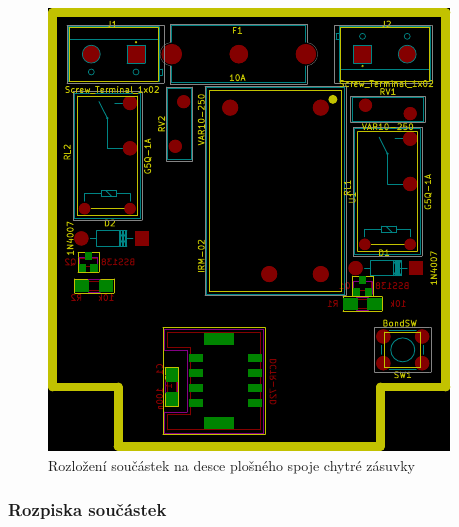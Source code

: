 \documentclass[12pt,a4paper,oneside]{article}
\begin{document}
\begin{figure}[H]
\centering
\label{fig:components}
\includegraphics{../img/kicad/components.pdf}
\caption{Rozložení součástek na desce plošného spoje chytré zásuvky}
\end{figure}

\newpage

\subsubsection{Rozpiska součástek}
\end{document}

